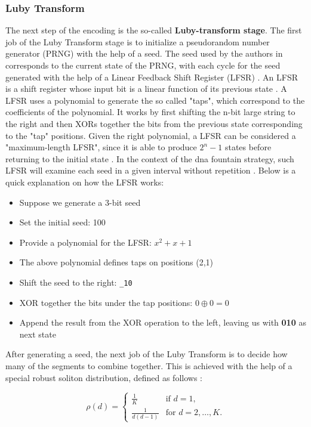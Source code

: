 \documentclass[12pt]%
{article}
\begin{document}
\subsubsection{Luby Transform}
The next step of the encoding is the so-called \textbf{Luby-transform stage}. The first job of the Luby Transform stage is to initialize a pseudorandom number generator (PRNG) with the help of a seed. The seed used by the authors in \cite{erlich2017dnasupplementary} corresponds to the current state of the PRNG, with each cycle for the seed generated with the help of a Linear Feedback Shift Register (LFSR) \cite{erlich2017dnasupplementary}. An LFSR is a shift register whose input bit is a linear function of its previous state \cite{hathwalia2014design}. A LFSR uses a polynomial to generate the so called "taps", which correspond to the coefficients of the polynomial. It works by first shifting the n-bit large string to the right and then XORs together the bits from the previous state corresponding to the "tap" positions. Given the right polynomial, a LFSR can be considered a "maximum-length LFSR", since it is able to produce \(2^{n}-1\) states before returning to the initial state \cite{hathwalia2014design}. In the context of the dna fountain strategy, such LFSR will examine each seed in a given interval without repetition \cite{erlich2017dnasupplementary}. Below is a quick explanation on how the LFSR works: 

\begin{itemize}
\item Suppose we generate a 3-bit seed
\item Set the initial seed: 100
\item Provide a polynomial for the LFSR: \(x^{2} + x + 1\)
\item The above polynomial defines taps on positions (2,1)
\item Shift the seed to the right:  \texttt{\_10}
\item XOR together the bits under the tap positions: \(0 \oplus 0 = 0\)
\item Append the result from the XOR operation to the left, leaving us with \textbf{010} as next state 
\end{itemize}

After generating a seed, the next job of the Luby Transform is to decide how many of the segments to combine together. This is achieved with the help of a special robust soliton distribution, defined as follows \cite{erlich2017dnasupplementary}:   

\[
\rho(d) = 
\begin{cases} 
\frac{1}{K} & \text{if } d = 1, \\
\frac{1}{d(d-1)} & \text{for } d = 2, \dots, K.
\end{cases}
\]
\end{document}
